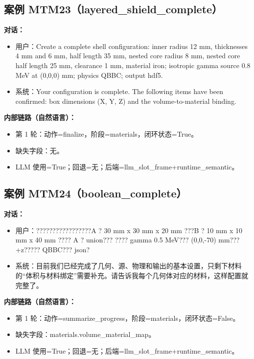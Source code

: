 \documentclass[11pt]{ctexart}
\begin{document}
\subsection{案例 MTM23（layered\_shield\_complete）}
\textbf{对话：}
\begin{itemize}
\item 用户：Create a complete shell configuration: inner radius 12 mm, thicknesses 4 mm and 6 mm, half length 35 mm, nested core radius 8 mm, nested core half length 25 mm, clearance 1 mm, material iron; isotropic gamma source 0.8 MeV at (0,0,0) mm; physics QBBC; output hdf5.
\item 系统：Your configuration is complete. The following items have been confirmed: box dimensions (X, Y, Z) and the volume-to-material binding.
\end{itemize}
\textbf{内部链路（自然语言）：}
\begin{itemize}
\item 第 1 轮：动作=finalize，阶段=materials，闭环状态=True。
\item 缺失字段：无。
\item LLM 使用=True；回退=无；后端=llm\_slot\_frame+runtime\_semantic。
\end{itemize}
\subsection{案例 MTM24（boolean\_complete）}
\textbf{对话：}
\begin{itemize}
\item 用户：?????????????????A ? 30 mm x 30 mm x 20 mm ???B ? 10 mm x 10 mm x 40 mm ???? A ? union??? ???? gamma 0.5 MeV??? (0,0,-70) mm??? +z????? QBBC??? json?
\item 系统：目前我们已经完成了几何、源、物理和输出的基本设置，只剩下材料的“体积与材料绑定”需要补充。请告诉我每个几何体对应的材料，这样配置就完整了。
\end{itemize}
\textbf{内部链路（自然语言）：}
\begin{itemize}
\item 第 1 轮：动作=summarize\_progress，阶段=materials，闭环状态=False。
\item 缺失字段：materials.volume\_material\_map。
\item LLM 使用=True；回退=无；后端=llm\_slot\_frame+runtime\_semantic。
\end{itemize}
\end{document}
